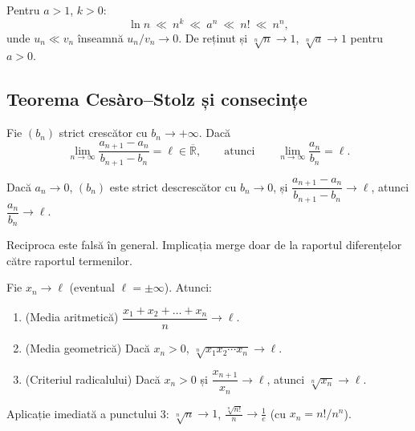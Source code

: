\begin{corolar}
Pentru $a>1$, $k>0$:
\[
\ln n \ \ll\ n^k \ \ll\ a^n \ \ll\ n! \ \ll\ n^n,
\]
unde $u_n\ll v_n$ înseamnă $u_n/v_n\to 0$. De reținut și $\sqrt[n]{n}\to 1$, $\sqrt[n]{a}\to 1$ pentru $a>0$.
\end{corolar}

\subsection{Teorema Cesàro--Stolz și consecințe}

\begin{teorema}
Fie $(b_n)$ strict crescător cu $b_n\to+\infty$. Dacă
\[
\lim_{n\to\infty}\frac{a_{n+1}-a_n}{b_{n+1}-b_n}=\ell\in\overline{\mathbb{R}},
\qquad\text{atunci}\qquad
\lim_{n\to\infty}\frac{a_n}{b_n}=\ell.
\]
\end{teorema}

\begin{teorema}
Dacă $a_n\to 0$, $(b_n)$ este strict descrescător cu $b_n\to 0$, și $\dfrac{a_{n+1}-a_n}{b_{n+1}-b_n}\to\ell$, atunci $\dfrac{a_n}{b_n}\to\ell$.
\end{teorema}

\begin{obs}
Reciproca este falsă în general. Implicația merge doar de la raportul diferențelor către raportul termenilor.
\end{obs}

\begin{corolar}
Fie $x_n\to\ell$ (eventual $\ell=\pm\infty$). Atunci:
\begin{enumerate}[leftmargin=*, itemsep=1pt]
\item (Media aritmetică) $\dfrac{x_1+x_2+\dots+x_n}{n}\to\ell$.
\item (Media geometrică) Dacă $x_n>0$, $\sqrt[n]{x_1 x_2\cdots x_n}\to\ell$.
\item (Criteriul radicalului) Dacă $x_n>0$ și $\dfrac{x_{n+1}}{x_n}\to\ell$, atunci $\sqrt[n]{x_n}\to\ell$.
\end{enumerate}
\end{corolar}

\begin{obs}
Aplicație imediată a punctului 3: $\displaystyle\sqrt[n]{n}\to 1$, $\displaystyle\frac{\sqrt[n]{n!}}{n}\to\frac{1}{e}$ (cu $x_n=n!/n^n$).
\end{obs}

